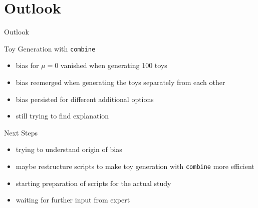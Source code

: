 \section{Outlook}
\begin{frame}{Outlook}

\begin{block}{Toy Generation with \texttt{combine}}
\begin{itemize}
\item bias for $\mu = 0$ vanished when generating 100 toys
\item bias reemerged when generating the toys separately from each other
\item bias persisted for different additional options
\item still trying to find explanation
\end{itemize}
\end{block}

\begin{block}{Next Steps}

\begin{itemize}
\item trying to understand origin of bias
\item maybe restructure scripts to make toy generation with \texttt{combine} more efficient
\item starting preparation of scripts for the actual study
\item waiting for further input from expert
\end{itemize}
  
\end{block}
\end{frame}
